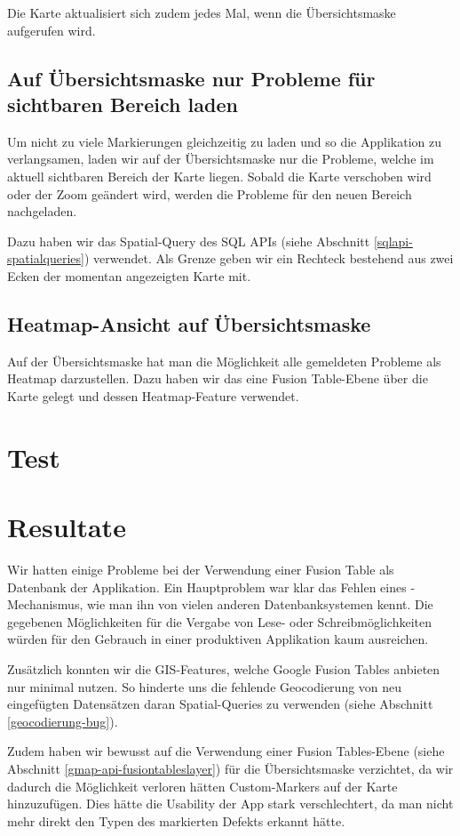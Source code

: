 Die Karte aktualisiert sich zudem jedes Mal, wenn die Übersichtsmaske aufgerufen wird.

\subsection{Auf Übersichtsmaske nur Probleme für sichtbaren Bereich laden}
Um nicht zu viele Markierungen gleichzeitig zu laden und so die Applikation zu verlangsamen, laden wir auf der Übersichtsmaske nur die Probleme, welche im aktuell sichtbaren Bereich der Karte liegen. Sobald die Karte verschoben wird oder der Zoom geändert wird, werden die Probleme für den neuen Bereich nachgeladen.

Dazu haben wir das Spatial-Query  des SQL APIs (siehe Abschnitt \ref{sqlapi-spatialqueries}) verwendet. Als Grenze geben wir ein Rechteck bestehend aus zwei Ecken der momentan angezeigten Karte mit.

\subsection{Heatmap-Ansicht auf Übersichtsmaske}
Auf der Übersichtsmaske hat man die Möglichkeit alle gemeldeten Probleme als Heatmap darzustellen. Dazu haben wir das eine Fusion Table-Ebene über die Karte gelegt und dessen Heatmap-Feature verwendet. 

\section{Test}

\section{Resultate}
Wir hatten einige Probleme bei der Verwendung einer Fusion Table als Datenbank der Applikation. Ein Hauptproblem war klar das Fehlen eines -Mechanismus, wie man ihn von vielen anderen Datenbanksystemen kennt. Die gegebenen Möglichkeiten für die Vergabe von Lese- oder Schreibmöglichkeiten würden für den Gebrauch in einer produktiven Applikation kaum ausreichen.

Zusätzlich konnten wir die GIS-Features, welche Google Fusion Tables anbieten nur minimal nutzen. So hinderte uns die fehlende  Geocodierung von neu eingefügten Datensätzen daran Spatial-Queries zu verwenden (siehe Abschnitt \ref{geocodierung-bug}).

Zudem haben wir bewusst auf die Verwendung einer Fusion Tables-Ebene (siehe Abschnitt \ref{gmap-api-fusiontableslayer}) für die Übersichtsmaske verzichtet, da wir dadurch die Möglichkeit verloren hätten Custom-Markers auf der Karte hinzuzufügen. Dies hätte die Usability der App stark verschlechtert, da man nicht mehr direkt den Typen des markierten Defekts erkannt hätte.

